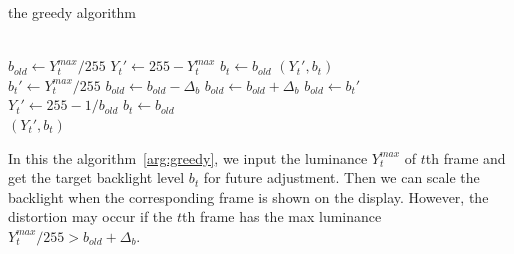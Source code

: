 \begin{algorithm}
  \caption{the greedy algorithm}
  \label{alg:greedy}
  \begin{algorithmic}[1]
    \\
      \State $b_{old} \gets Y_{t}^{max} / 255$
      \State $Y_{t}' \gets 255 - Y_{t}^{max}$
      \State $b_{t} \gets b_{old}$
      \Return $(Y_{t}', b_t)$
    \EndIf
      \\
      \State $b_{t}' \gets Y_{t}^{max} / 255$
      \State $b_{old} \gets b_{old} - \Delta_{b}$
      \State $b_{old} \gets b_{old} + \Delta_{b}$
    \Else
      \State $b_{old} \gets b_{t}'$
    \EndIf
    \\
    \State $Y_{t}' \gets 255 - 1 / b_{old}$
    \State $b_{t} \gets b_{old}$\\
    \Return $(Y_{t}', b_{t})$
  \end{algorithmic}
  
\end{algorithm}

In this the algorithm~\ref{arg:greedy}, we input the luminance
$Y_{t}^{max}$ of $t$th frame and get the target backlight level
$b_{t}$ for future adjustment. Then we can scale the backlight when
the corresponding frame is shown on the display. However, the distortion
may occur if the $t$th frame has the max luminance $Y_t^{max}/255 >
b_{old} + \Delta_b$.






